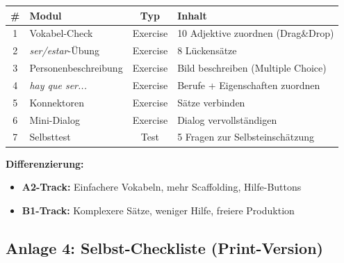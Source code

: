 \documentclass[11pt,a4paper]{article}
\begin{document}
\begin{tabular}{|c|l|c|p{5cm}|}
\hline
\textbf{\#} & \textbf{Modul} & \textbf{Typ} & \textbf{Inhalt} \\
\hline
1 & Vokabel-Check & Exercise & 10 Adjektive zuordnen (Drag\&Drop) \\
\hline
2 & \textit{ser/estar}-Übung & Exercise & 8 Lückensätze \\
\hline
3 & Personenbeschreibung & Exercise & Bild beschreiben (Multiple Choice) \\
\hline
4 & \textit{hay que ser...} & Exercise & Berufe + Eigenschaften zuordnen \\
\hline
5 & Konnektoren & Exercise & Sätze verbinden \\
\hline
6 & Mini-Dialog & Exercise & Dialog vervollständigen \\
\hline
7 & Selbsttest & Test & 5 Fragen zur Selbsteinschätzung \\
\hline
\end{tabular}

\textbf{Differenzierung:}
\begin{itemize}
    \item \textcolor{gruppeA}{\textbf{A2-Track:}} Einfachere Vokabeln, mehr Scaffolding, Hilfe-Buttons
    \item \textcolor{gruppeB}{\textbf{B1-Track:}} Komplexere Sätze, weniger Hilfe, freiere Produktion
\end{itemize}

\subsection{Anlage 4: Selbst-Checkliste (Print-Version)}
\end{document}

